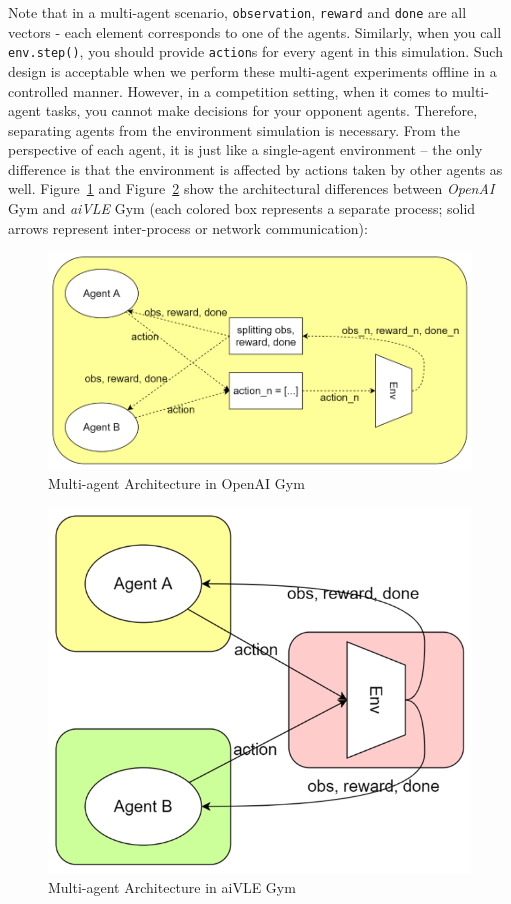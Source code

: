 Note that in a multi-agent scenario, \texttt{observation}, \texttt{reward} and \texttt{done} are all vectors - each element corresponds to one of the agents. Similarly, when you call \texttt{env.step()}, you should provide \texttt{action}s for every agent in this simulation. Such design is acceptable when we perform these multi-agent experiments offline in a controlled manner. However, in a competition setting, when it comes to multi-agent tasks, you cannot make decisions for your opponent agents. Therefore, separating agents from the environment simulation is necessary. From the perspective of each agent, it is just like a single-agent environment – the only difference is that the environment is affected by actions taken by other agents as well. Figure~\ref{fig:opanai-gym-multi-arch} and Figure~\ref{fig:aivle-gym-multi-arch} show the architectural differences between \emph{OpenAI} Gym and \emph{aiVLE} Gym (each colored box represents a separate process; solid arrows represent inter-process or network communication):
\begin{figure}[H]
    \centering
    \includegraphics{images/opanai-gym-multi-arch.png}
    \caption{Multi-agent Architecture in OpenAI Gym}
    \label{fig:opanai-gym-multi-arch}
\end{figure}
\begin{figure}[H]
    \centering
    \includegraphics{images/aivle-gym-multi-arch.png}
    \caption{Multi-agent Architecture in aiVLE Gym}
    \label{fig:aivle-gym-multi-arch}
\end{figure}


